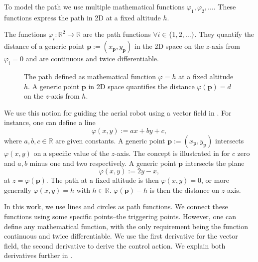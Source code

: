 To model the path we use multiple mathematical functions $\varphi_1,\varphi_2,\dots$. These functions express the path in 2D at a fixed altitude $h$. 

\begin{highlight}
  \begin{defn}
    The functions $\varphi_i:\mathbb{R}^2\rightarrow\mathbb{R}$ are the path functions $\forall i\in\{1,2,\dots\}$. They quantify the distance of a generic point $\mathbf{p}:=(x_{\mathbf{p}},y_{\mathbf{p}})$ in the 2D space on the $z$-axis from $\varphi_i=0$ and are continuous and twice differentiable. 
  \end{defn}
\end{highlight}

\begin{figure}[t]
  \centering
  
  \caption[Concept of the path and generic point in space]{The path defined as mathematical function $\varphi=h$ at a fixed altitude $h$. A generic point $\mathbf{p}$ in 2D space quantifies the distance $\varphi(\mathbf{p})=d$ on the $z$-axis from $h$.}
  \label{fig:plot1}
\end{figure}

We use this notion for guiding the aerial robot using a vector field in . For instance, one can define a line
\begin{equation}\label{eq:basic-path}
  \varphi(x,y):=ax+by+c,
\end{equation}
where $a,b,c\in\mathbb{R}$ are given constants. A generic point $\mathbf{p}:=(x_{\mathbf{p}},y_{\mathbf{p}})$ intersects $\varphi(x,y)$ on a specific value of the $z$-axis. The concept is illustrated in  for $c$ zero and $a,b$ minus one and two respectively. A generic point $\mathbf{p}$ intersects the plane
\begin{equation}
  \varphi(x,y):=2y-x,
\end{equation}
at $z=\varphi(\mathbf{p})$. The path at a fixed altitude is then $\varphi(x,y)=0$, or more generally $\varphi(x,y)=h$ with $h\in\mathbb{R}$. $\varphi(\mathbf{p})-h$ is then the distance on $z$-axis.

In this work, we use lines and circles as path functions. We connect these functions using some specific points--the triggering points. However, one can define any mathematical function, with the only requirement being the function continuous and twice differentiable. We use the first derivative for the vector field, the second derivative to derive the control action. We explain both derivatives further in .

